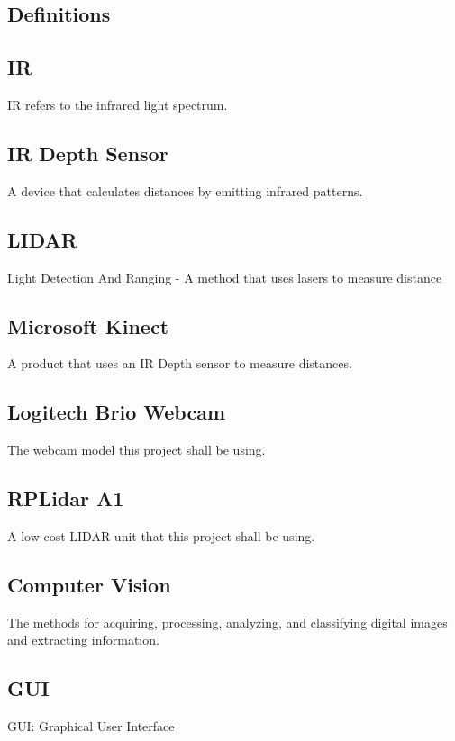 \documentclass[onecolumn, draftclsnofoot,10pt, compsoc]{IEEEtran}
\begin{document}
\begin{singlespace}
	\section{Definitions}
		\subsection{IR}\label{def:IR}
		IR refers to the infrared light spectrum.

		\subsection{IR Depth Sensor}\label{def:depthsensor}
		A device that calculates distances by emitting infrared patterns. 
		
		\subsection{LIDAR}\label{def:lidar}
		Light Detection And Ranging - A method that uses lasers to measure distance
		
		\subsection{Microsoft Kinect}\label{def:kinect}
		A product that uses an IR Depth sensor to measure distances.
		
		\subsection{Logitech Brio Webcam}\label{def:brio}
		The webcam model this project shall be using.
		
		\subsection{RPLidar A1}\label{def:rplidar}
		A low-cost LIDAR unit that this project shall be using.
		
		\subsection{Computer Vision }\label{def:vision}
		The methods for acquiring, processing, analyzing, and classifying digital images and extracting information.
		
		\subsection{GUI}\label{def:gui}
		GUI: Graphical User Interface


\end{singlespace}
\end{document}
